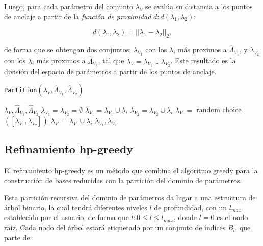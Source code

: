 Luego, para cada parámetro del conjunto $\lambda_V$ se evalúa su distancia a los puntos de anclaje a partir de la \textit{función de proximidad} $d: d(\lambda_1, \lambda_2)$:

\[
d(\lambda_1, \lambda_2) = ||\lambda_1 - \lambda_2||_2,
\]

de forma que se obtengan dos conjuntos; $\lambda_{V_1}$ con los $\lambda_{i}$ más proximos a $\hat{\Lambda}_{V_1}$, y $\lambda_{V_2}$ con los $\lambda_{i}$ más proximos a $\hat{\Lambda}_{V_2}$, tal que  $\lambda_{V} =\lambda_{V_1} \cup \lambda_{V_2}$. Este resultado es la división del espacio de parámetros a partir de los puntos de anclaje.

\begin{algorithm}
\caption{\texttt{Partition}\((\lambda_V, \hat{\Lambda}_{V_1}, \hat{\Lambda}_{V_2})\)}\label{alg:part}
\begin{algorithmic}[1]
\Require $\lambda_V, \hat{\Lambda}_{V_1}, \hat{\Lambda}_{V_2}$ 
\vspace{3mm}
\State $\lambda_{V_1} = \lambda_{V_2} = \emptyset$
		\State $\lambda_{V_1} = \lambda_{V_1} \cup \lambda_i$
		\State $\lambda_{V_2} = \lambda_{V_2} \cup \lambda_i$
	\Else
		\State $\lambda_{V'} = $ random choice$([\lambda_{V_1}, \lambda_{V_2}])$
		\State $\lambda_{V'} = \lambda_{V'} \cup \lambda_i$
	\EndIf
\EndFor
\vspace{3mm}
\Ensure $\lambda_{V_1}, \lambda_{V_2}$
\end{algorithmic}
\end{algorithm}

\subsection{Refinamiento hp-greedy}


El refinamiento hp-greedy es un método que combina el algoritmo greedy para la construcción de bases reducidas con la partición del dominio de parámetros. 

Esta partición recursiva del dominio de parámetros da lugar a una estructura de árbol binario, la cual tendrá diferentes niveles $l$ de profundidad, con un $l_{max}$ establecido por el usuario, de forma que $l : 0 \le l \le l_{max}$, donde $l =0$ es el nodo raíz. Cada nodo del árbol estará etiquetado por un conjunto de índices $B_l$, que parte de:

